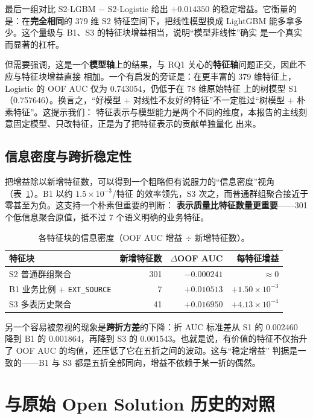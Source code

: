 \documentclass[11pt,UTF8,fontset=windows]{ctexrep}
\begin{document}
最后一组对比 S2-LGBM $-$ S2-Logistic 给出 $+0.014350$ 的稳定增益。它衡量的是：在\textbf{完全相同}的 379 维
S2 特征空间下，把线性模型换成 LightGBM 能多拿多少。这个量级与 B1、S3 的特征块增益相当，说明“模型非线性”确实
是一个真实而显著的杠杆。

但需要强调，这是一个\textbf{模型轴}上的结果，与 RQ1 关心的\textbf{特征轴}问题正交，因此不应与特征块增益直接
相加。一个有启发的旁证是：在更丰富的 379 维特征上，Logistic 的 OOF AUC 仅为 0.743054，仍低于在 78 维原始特征
上的树模型 S1（0.757646）。换言之，“好模型 + 对线性不友好的特征”不一定胜过“树模型 + 朴素特征”。这提示我们：
特征表示与模型能力是两个不同的维度，本报告的主线刻意固定模型、只改特征，正是为了把特征表示的贡献单独量化
出来。

\subsection{信息密度与跨折稳定性}

把增益除以新增特征数，可以得到一个粗略但有说服力的“信息密度”视角（表~\ref{tab:rq1-density}）。B1 以约
$1.5\times10^{-3}$/特征 的效率领先，S3 次之，而普通群组聚合接近于零甚至为负。这支持一个朴素但重要的判断：
\textbf{表示质量比特征数量更重要}——301 个低信息聚合原值，抵不过 7 个语义明确的业务特征。

\begin{table}[h]
\centering
\caption{各特征块的信息密度（OOF AUC 增益 $\div$ 新增特征数）。}
\label{tab:rq1-density}
\begin{tabular}{lrrr}
\toprule
特征块 & 新增特征数 & $\Delta$OOF AUC & 每特征增益 \\
\midrule
S2 普通群组聚合 & 301 & $-0.000241$ & $\approx 0$ \\
B1 业务比例 + \texttt{EXT\_SOURCE} & 7 & $+0.010513$ & $+1.50\times10^{-3}$ \\
S3 多表历史聚合 & 41 & $+0.016950$ & $+4.13\times10^{-4}$ \\
\bottomrule
\end{tabular}
\end{table}

另一个容易被忽视的现象是\textbf{跨折方差}的下降：折 AUC 标准差从 S1 的 0.002460 降到 B1 的 0.001864，再降到
S3 的 0.001543。也就是说，有价值的特征不仅抬升了 OOF AUC 的均值，还压低了它在五折之间的波动。这与“稳定增益”
判据是一致的——B1 与 S3 都是五折全部同向，增益不依赖于某一折的偶然。

\section{与原始 Open Solution 历史的对照}
\end{document}
